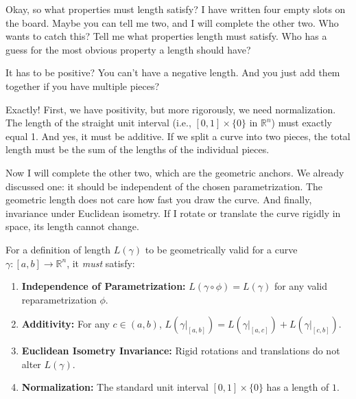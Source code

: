\begin{spoken-clean}[00:12:30 - 00:14:15]
Okay, so what properties must length satisfy? I have written four empty slots on the board. Maybe you can tell me two, and I will complete the other two. Who wants to catch this? Tell me what properties length must satisfy. Who has a guess for the most obvious property a length should have?
\end{spoken-clean}

\begin{student-question}
It has to be positive? You can't have a negative length. And you just add them together if you have multiple pieces?
\end{student-question}

\begin{spoken-clean}[00:14:15 - 00:17:30]
Exactly! First, we have positivity, but more rigorously, we need normalization. The length of the straight unit interval (i.e., $[0,1] \times \{0\}$ in $\mathbb{R}^n$) must exactly equal 1. And yes, it must be additive. If we split a curve into two pieces, the total length must be the sum of the lengths of the individual pieces. 

Now I will complete the other two, which are the geometric anchors. We already discussed one: it should be independent of the chosen parametrization. The geometric length does not care how fast you draw the curve. And finally, invariance under Euclidean isometry. If I rotate or translate the curve rigidly in space, its length cannot change.
\end{spoken-clean}

\begin{orange-formula}
\begin{definition}
For a definition of length $L(\gamma)$ to be geometrically valid for a curve $\gamma: [a, b] \to \mathbb{R}^n$, it \textit{must} satisfy:
\begin{enumerate}
    \item \textbf{Independence of Parametrization:} $L(\gamma \circ \phi) = L(\gamma)$ for any valid reparametrization $\phi$.
    \item \textbf{Additivity:} For any $c \in (a, b)$, $L(\gamma|_{[a, b]}) = L(\gamma|_{[a, c]}) + L(\gamma|_{[c, b]})$.
    \item \textbf{Euclidean Isometry Invariance:} Rigid rotations and translations do not alter $L(\gamma)$.
    \item \textbf{Normalization:} The standard unit interval $[0,1] \times \{0\}$ has a length of $1$.
\end{enumerate}
\end{definition}
\end{orange-formula}

